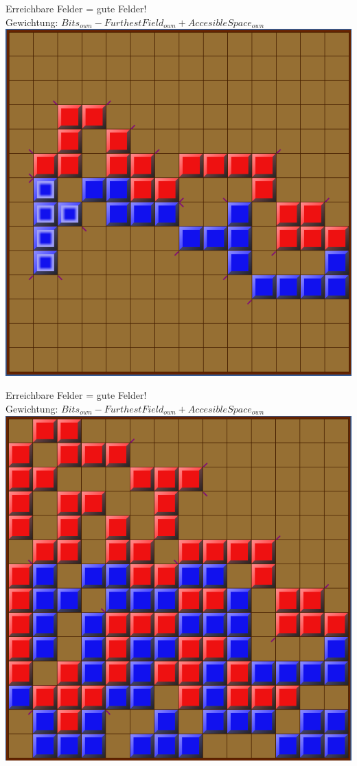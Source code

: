 \documentclass[12pt, draft]{beamer}
\begin{document}
\begin{frame}
	Erreichbare Felder = gute Felder!\\
	Gewichtung: $Bits_{own} - FurthestField_{own} + AccesibleSpace_{own}$
	\pause
	\includegraphics[width=0.6\linewidth]{media/wgh19.png}
\end{frame}
\begin{frame}
	Erreichbare Felder = gute Felder!\\
	Gewichtung: $Bits_{own} - FurthestField_{own} + AccesibleSpace_{own}$
	\includegraphics[width=0.6\linewidth]{media/wgh20.png}
\end{frame}
\end{document}
